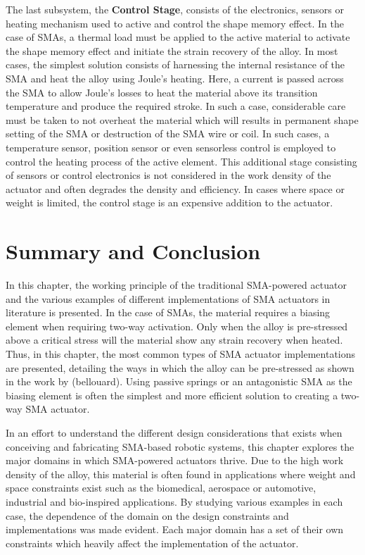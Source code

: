 The last subsystem, the \textbf{Control Stage}, consists of the electronics, sensors or heating mechanism used to active and control the shape memory effect. In the case of SMAs, a thermal load must be applied to the active material to activate the shape memory effect and initiate the strain recovery of the alloy. In most cases, the simplest solution consists of harnessing the internal resistance of the SMA and heat the alloy using Joule's heating. Here, a current is passed across the SMA to allow Joule's losses to heat the material above its transition temperature and produce the required stroke. In such a case, considerable care must be taken to not overheat the material which will results in permanent shape setting of the SMA or destruction of the SMA wire or coil. In such cases, a temperature sensor, position sensor or even sensorless control is employed to control the heating process of the active element. This additional stage consisting of sensors or control electronics is not considered in the work density of the actuator and often degrades the density and efficiency. In cases where space or weight is limited, the control stage is an expensive addition to the actuator.
\section{Summary and Conclusion}
In this chapter, the working principle of the traditional SMA-powered actuator and the various examples of different implementations of SMA actuators in literature is presented. In the case of SMAs, the material requires a biasing element when requiring two-way activation. Only when the alloy is pre-stressed above a critical stress will the material show any strain recovery when heated. Thus, in this chapter, the most common types of SMA actuator implementations are presented, detailing the ways in which the alloy can be pre-stressed as shown in the work by \todocite (bellouard). Using passive springs or an antagonistic SMA as the biasing element is often the simplest and more efficient solution to creating a two-way SMA actuator.

In an effort to understand the different design considerations that exists when conceiving and fabricating SMA-based robotic systems, this chapter explores the major domains in which SMA-powered actuators thrive. Due to the high work density of the alloy, this material is often found in applications where weight and space constraints exist such as the biomedical, aerospace or automotive, industrial and bio-inspired applications. By studying various examples in each case, the dependence of the domain on the design constraints and implementations was made evident. Each major domain has a set of their own constraints which heavily affect the implementation of the actuator.

